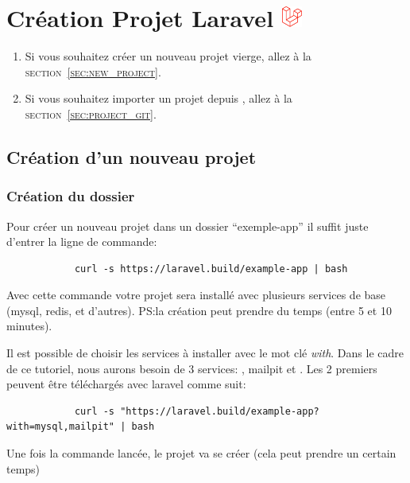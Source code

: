 \section[Création Projet Laravel]{Création Projet Laravel \includegraphics[height=20pt]{figures-logos/laravel.pdf}}

\begin{enumerate}
    \item Si vous souhaitez créer un nouveau projet vierge, allez à la \textsc{section~\ref{sec:new_project}}.
    \item Si vous souhaitez importer un projet depuis \github{}, allez à la \textsc{section~\ref{sec:project_git}}.
\end{enumerate}

\subsection[Création d'un nouveau projet]{Création d'un nouveau projet\label{sec:new_project}}
    \subsubsection[Création du dossier]{Création du dossier}
        Pour créer un nouveau projet \laravel{} dans un dossier ``exemple-app'' il suffit juste d'entrer la ligne de commande:

        \begin{lstlisting}
            curl -s https://laravel.build/example-app | bash
        \end{lstlisting}

        Avec cette commande votre projet sera installé avec plusieurs services de base (mysql, redis, et d'autres). PS:la création peut prendre du temps (entre 5 et 10 minutes).

        Il est possible de choisir les services à installer avec le mot clé \textit{with}. Dans le cadre de ce tutoriel, nous aurons besoin de 3 services: \mysql, mailpit et \phpmyadmin. Les 2 premiers peuvent être téléchargés avec laravel comme suit:

        \begin{lstlisting}
            curl -s "https://laravel.build/example-app?with=mysql,mailpit" | bash
        \end{lstlisting}

        Une fois la commande lancée, le projet va se créer (cela peut prendre un certain temps)

